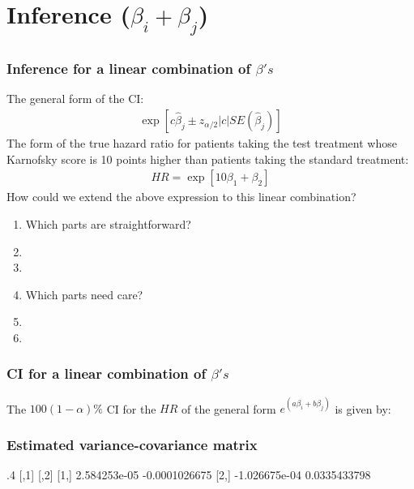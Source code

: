 \section[Inference ($\beta_i + \beta_j$)]{Inference ($\beta_i + \beta_j$)}
\subsection{}
\begin{frame}
\end{frame}

\begin{frame}
\frametitle{Inference for a linear combination of $\beta's$}
The general form of the CI:
\begin{eqnarray}
\exp\left[c\hat{\beta}_j\pm z_{\alpha/2}|c|{SE}(\hat{\beta}_j)\right] \nonumber
\end{eqnarray}
The form of the true hazard ratio for patients taking the test treatment whose Karnofsky score is 10 points
 higher than patients taking the standard treatment:
\begin{eqnarray}
HR = \exp[10\beta_1+\beta_2] \nonumber
\end{eqnarray}
How could we extend the above expression to this linear combination?
\begin{enumerate}
\item Which parts are straightforward?
\item[]
\item[]
\item Which parts need care?
\item[]
\item[]
\end{enumerate}
\end{frame}

\begin{frame}
\frametitle{CI for a linear combination of $\beta's$}
The $100(1-\alpha)\%$ CI for the $HR$ of the general form $e^{(a{\beta}_i+b{\beta}_j)}$ is given by:
\vskip200pt
\end{frame}


\begin{frame}[fragile]
\frametitle{Estimated variance-covariance matrix}
\vskip5pt
\begin{Rout}{.4}
              [,1]          [,2]
[1,]  2.584253e-05 -0.0001026675
[2,] -1.026675e-04  0.0335433798
\end{Rout}
\vskip200pt
\end{frame}

